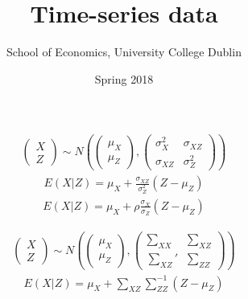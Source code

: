 \documentclass{beamer}
\title{Time-series data}
\author{School of Economics, University College Dublin}
\date{Spring 2018}
\begin{document}
\begin{frame}
 \titlepage
\end{frame}


\begin{frame}
  \begin{align}
    \begin{pmatrix}      X \\Z     \end{pmatrix}
    \sim N \left ( \begin{pmatrix}      \mu_X \\ \mu_Z    \end{pmatrix},
    \begin{pmatrix}       \sigma^2_X & \sigma_{XZ} \\ \sigma_{XZ} & \sigma^2_Z     \end{pmatrix} \right )
  \end{align}
  \begin{align}
    E(X|Z) = \mu_X + \frac{\sigma_{XZ}}{\sigma^2_Z}(Z-\mu_Z)
  \end{align}
  \begin{align}
    E(X|Z) = \mu_X + \rho \frac{\sigma_X}{\sigma_Z}(Z-\mu_Z)
  \end{align}
\end{frame}

\begin{frame}
  \begin{align}
    \begin{pmatrix}      X \\ Z    \end{pmatrix} \sim N \left( 
    \begin{pmatrix}      \mu_X \\ \mu_Z    \end{pmatrix},
    \begin{pmatrix}      \sum_{XX} & \sum_{XZ} \\ \sum_{XZ}' & \sum_{ZZ}    \end{pmatrix}
    \right)
  \end{align}
  \begin{align}
    E(X|Z) = \mu_X + \scriptstyle \sum_{XZ}\sum^{-1}_{ZZ} \textstyle(Z-\mu_Z)
  \end{align}
\end{frame}
\end{document}
